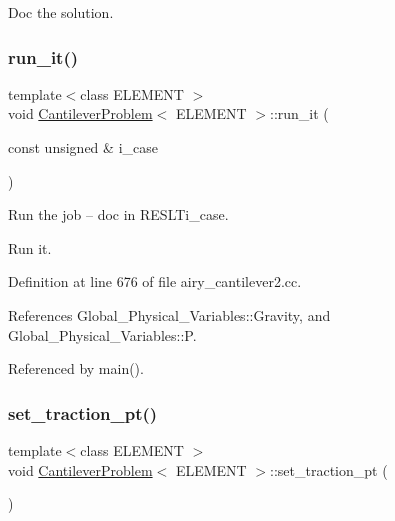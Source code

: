 Doc the solution. 

\mbox{\label{classCantileverProblem_a5c78c6602e0cbeac68239804c2d52243}} 
\subsubsection{\texorpdfstring{run\+\_\+it()}{run\_it()}}
{\footnotesize\ttfamily template$<$class E\+L\+E\+M\+E\+NT $>$ \\
void \hyperlink{classCantileverProblem}{Cantilever\+Problem}$<$ E\+L\+E\+M\+E\+NT $>$\+::run\+\_\+it (\begin{DoxyParamCaption}\item[{const unsigned \&}]{i\+\_\+case }\end{DoxyParamCaption})}



Run the job -- doc in R\+E\+S\+L\+Ti\+\_\+case. 

Run it. 

Definition at line 676 of file airy\+\_\+cantilever2.\+cc.



References Global\+\_\+\+Physical\+\_\+\+Variables\+::\+Gravity, and Global\+\_\+\+Physical\+\_\+\+Variables\+::P.



Referenced by main().

\mbox{\label{classCantileverProblem_a96a9716947a15930f3881fcec6d448e2}} 
\subsubsection{\texorpdfstring{set\+\_\+traction\+\_\+pt()}{set\_traction\_pt()}\hspace{0.1cm}{\footnotesize\ttfamily [1/2]}}
{\footnotesize\ttfamily template$<$class E\+L\+E\+M\+E\+NT $>$ \\
void \hyperlink{classCantileverProblem}{Cantilever\+Problem}$<$ E\+L\+E\+M\+E\+NT $>$\+::set\+\_\+traction\+\_\+pt (\begin{DoxyParamCaption}{ }\end{DoxyParamCaption})\hspace{0.3cm}{\ttfamily [private]}}



